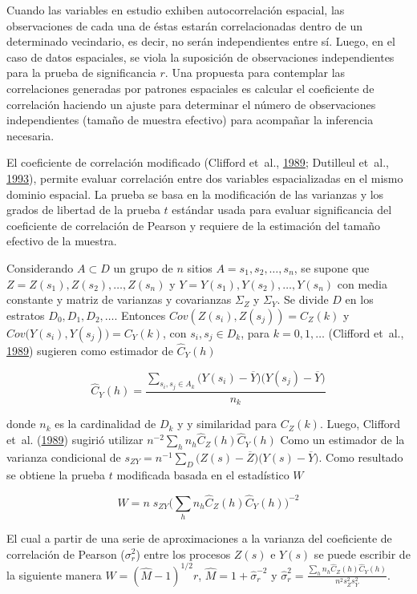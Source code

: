 \documentclass[11pt,b5paper,]{krantz}
\begin{document}
Cuando las variables en estudio exhiben autocorrelación espacial, las
observaciones de cada una de éstas estarán correlacionadas dentro de un
determinado vecindario, es decir, no serán independientes entre sí.
Luego, en el caso de datos espaciales, se viola la suposición de
observaciones independientes para la prueba de significancia \(r\). Una
propuesta para contemplar las correlaciones generadas por patrones
espaciales es calcular el coeficiente de correlación haciendo un ajuste
para determinar el número de observaciones independientes (tamaño de
muestra efectivo) para acompañar la inferencia necesaria.

El coeficiente de correlación modificado (Clifford et~al.,
\protect\hyperlink{ref-Clifford_Richardson_Hemon_1989}{1989}; Dutilleul
et~al.,
\protect\hyperlink{ref-Dutilleul_Clifford_Richardson_Hemon_1993}{1993}),
permite evaluar correlación entre dos variables espacializadas en el
mismo dominio espacial. La prueba se basa en la modificación de las
varianzas y los grados de libertad de la prueba \(t\) estándar usada
para evaluar significancia del coeficiente de correlación de Pearson y
requiere de la estimación del tamaño efectivo de la muestra.

Considerando \(A \subset D\) un grupo de \(n\) sitios
\(A={s_1, s_2,…,s_n}\), se supone que \(Z=Z(s_1), Z(s_2),…, Z(s_n)\) y
\(Y= Y(s_1), Y(s_2),…,Y(s_n)\) con media constante y matriz de varianzas
y covarianzas \(\Sigma_Z\) y \(\Sigma_Y\). Se divide \(D\) en los
estratos \(D_0, D_1, D_2,…\). Entonces \(Cov(Z(s_i),Z(s_j))= C_Z(k)\) y
\(Cov\big(Y(s_i),Y(s_j)\big)= C_Y(k)\), con \(s_i, s_j \in D_k\), para
\(k= 0,1,…\) (Clifford et~al.,
\protect\hyperlink{ref-Clifford_Richardson_Hemon_1989}{1989}) sugieren
como estimador de \(\hat{C}_Y(h)\)

\[ \hat{C}_Y(h) = \frac{\sum_{s_i,s_j \in A_k}{\big( Y(s_i) - \overline{Y} \big) \big( Y(s_j) - \overline{Y} \big)}} {n_k} \]

donde \(n_k\) es la cardinalidad de \(D_k\) y y similaridad para
\(C_Z(k)\). Luego, Clifford et~al.
(\protect\hyperlink{ref-Clifford_Richardson_Hemon_1989}{1989}) sugirió
utilizar \(n^{-2}\sum_h{n_h\hat{C}_Z(h) \hat{C}_Y(h)}\) Como un
estimador de la varianza condicional de
\(s_{ZY}=n^{-1} \sum_D{ \big(Z(s)-\overline{Z} \big) \big(Y(s)-\overline{Y} \big) }\).
Como resultado se obtiene la prueba \(t\) modificada basada en el
estadístico \(W\)

\[W=n \; s_{ZY} \Big( \sum_h{n_h \hat{C}_Z(h) \hat{C}_Y(h)} \Big)^{-2}\]

El cual a partir de una serie de aproximaciones a la varianza del
coeficiente de correlación de Pearson (\(\sigma_r^2\)) entre los
procesos \(Z(s)\) e \(Y(s)\) se puede escribir de la siguiente manera
\(W=(\hat{M}-1)^{1/2}r\), \(\hat{M} = 1 + {\hat{\sigma}}_r^{-2}\) y
\(\hat{\sigma}_r^2 = \frac{\sum_h{n_h \hat{C}_Z(h) \hat{C}_Y(h)}} {n^2 s_Z^2 s_Y^2}\).
\end{document}
